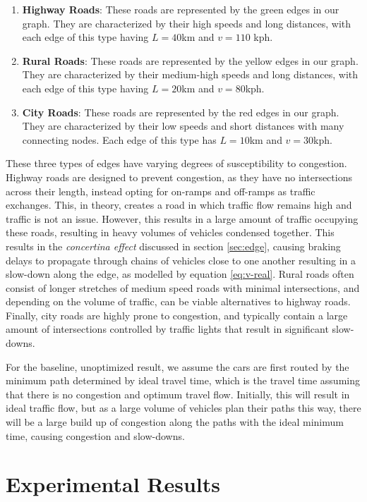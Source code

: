 \documentclass[conference]{IEEEtran}
\begin{document}
\begin{enumerate}
    \item \textbf{Highway Roads}: These roads are represented by the green edges in our graph. They are characterized by their high speeds and long distances, with each edge of this type having $L = 40$km and $v = 110$ kph.
    \item \textbf{Rural Roads}: These roads are represented by the yellow edges in our graph. They are characterized by their medium-high speeds and long distances, with each edge of this type having $L = 20$km and $v = 80$kph.
    \item \textbf{City Roads}: These roads are represented by the red edges in our graph. They are characterized by their low speeds and short distances with many connecting nodes. Each edge of this type has $L = 10$km and $v = 30$kph.
\end{enumerate}

These three types of edges have varying degrees of susceptibility to congestion. Highway roads are designed to prevent congestion, as they have no intersections across their length, instead opting for on-ramps and off-ramps as traffic exchanges. This, in theory, creates a road in which traffic flow remains high and traffic is not an issue. However, this results in a large amount of traffic occupying these roads, resulting in heavy volumes of vehicles condensed together. This results in the \textit{concertina effect} discussed in section \ref{sec:edge}, causing braking delays to propagate through chains of vehicles close to one another resulting in a slow-down along the edge, as modelled by equation \ref{eq:v-real}. Rural roads often consist of longer stretches of medium speed roads with minimal intersections, and depending on the volume of traffic, can be viable alternatives to highway roads. Finally, city roads are highly prone to congestion, and typically contain a large amount of intersections controlled by traffic lights that result in significant slow-downs.

For the baseline, unoptimized result, we assume the cars are first routed by the minimum path determined by ideal travel time, which is the travel time assuming that there is no congestion and optimum travel flow. Initially, this will result in ideal traffic flow, but as a large volume of vehicles plan their paths this way, there will be a large build up of congestion along the paths with the ideal minimum time, causing congestion and slow-downs. 

\section{Experimental Results}

\printbibliography
\end{document}
